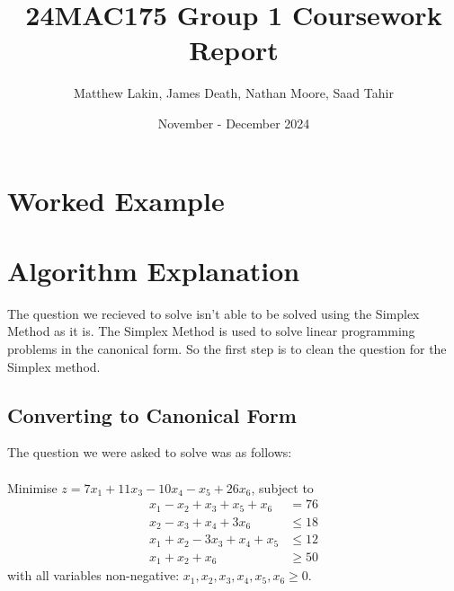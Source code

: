 \documentclass{article}
\title{24MAC175 Group 1 Coursework Report}
\author{Matthew Lakin, James Death, Nathan Moore, Saad Tahir}
\date{November - December 2024}
\numberwithin{equation}{section}
\begin{document}
\maketitle
\newpage
\tableofcontents
\newpage

\section{Worked Example}

\newpage
\section{Algorithm Explanation}
The question we recieved to solve isn't able to be solved using the Simplex Method as it is. The Simplex Method is used to solve linear programming problems in the canonical form. So the first step is to clean the question for the Simplex method.
\subsection{Converting to Canonical Form}
The question we were asked to solve was as follows: \\ \\
Minimise $z = 7x_1 + 11x_3 - 10x_4 - x_5 + 26x_6$, subject to
\begin{align}
    x_1 - x_2 + x_3 + x_5 + x_6 &= 76  \label{lpp1:constraint1} \\
    x_2 - x_3 + x_4 + 3x_6 &\leq 18 \label{lpp1:constraint2} \\
    x_1 + x_2 - 3x_3 + x_4 + x_5 &\leq 12 \label{lpp1:constraint3} \\
    x_1 + x_2 + x_6 &\geq 50 \label{lpp1:constraint4}
\end{align}
with all variables non-negative: $x_1, x_2, x_3, x_4, x_5, x_6 \geq 0$. \\ 
\end{document}
